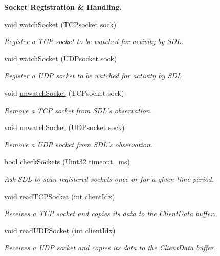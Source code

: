 \begin{Indent}{\bf Socket Registration \& Handling.}\par
\begin{DoxyCompactItemize}
\item 
void \hyperlink{classNetManager_add0bbb27a9593512aa2cff1a353316ac}{watch\-Socket} (T\-C\-Psocket sock)
\begin{DoxyCompactList}\small\item\em Register a T\-C\-P socket to be watched for activity by S\-D\-L. \end{DoxyCompactList}\item 
void \hyperlink{classNetManager_aff38e9c6b4cc21b180d9285ed8ec9ea7}{watch\-Socket} (U\-D\-Psocket sock)
\begin{DoxyCompactList}\small\item\em Register a U\-D\-P socket to be watched for activity by S\-D\-L. \end{DoxyCompactList}\item 
void \hyperlink{classNetManager_a4db6d32d623b5a0a1bda8f3decb6aa6f}{unwatch\-Socket} (T\-C\-Psocket sock)
\begin{DoxyCompactList}\small\item\em Remove a T\-C\-P socket from S\-D\-L's observation. \end{DoxyCompactList}\item 
void \hyperlink{classNetManager_aaa90ba38c3605d8473292c5e7585bd20}{unwatch\-Socket} (U\-D\-Psocket sock)
\begin{DoxyCompactList}\small\item\em Remove a U\-D\-P socket from S\-D\-L's observation. \end{DoxyCompactList}\item 
bool \hyperlink{classNetManager_a64ca334dbe3e4b540236aa35dccc96df}{check\-Sockets} (Uint32 timeout\-\_\-ms)
\begin{DoxyCompactList}\small\item\em Ask S\-D\-L to scan registered sockets once or for a given time period. \end{DoxyCompactList}\item 
void \hyperlink{classNetManager_a80c34b6f1d22a0db77a6f5063e6d31d9}{read\-T\-C\-P\-Socket} (int client\-Idx)
\begin{DoxyCompactList}\small\item\em Receives a T\-C\-P socket and copies its data to the \hyperlink{structClientData}{Client\-Data} buffer. \end{DoxyCompactList}\item 
void \hyperlink{classNetManager_a70c29117dc3c7fd49cee0444944a8eee}{read\-U\-D\-P\-Socket} (int client\-Idx)
\begin{DoxyCompactList}\small\item\em Receives a U\-D\-P socket and copies its data to the \hyperlink{structClientData}{Client\-Data} buffer. \end{DoxyCompactList}\end{DoxyCompactItemize}
\end{Indent}
